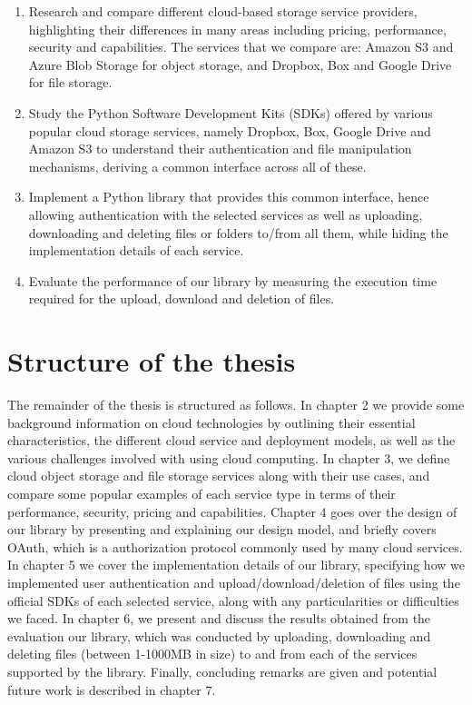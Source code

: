 \begin{enumerate}
	\item Research and compare different cloud-based storage service providers, highlighting their differences in many areas including pricing, performance, security and capabilities. The services that we compare are: Amazon S3 and Azure Blob Storage for object storage, and Dropbox, Box and Google Drive for file storage.

	\item Study the Python Software Development Kits (SDKs) offered by various popular cloud storage services, namely Dropbox, Box, Google Drive and Amazon S3 to understand their authentication and file manipulation mechanisms, deriving a common interface across all of these.

	\item Implement a Python library that provides this common interface, hence allowing authentication with the selected services as well as uploading, downloading and deleting files or folders to/from all them, while hiding the implementation details of each service.

	\item Evaluate the performance of our library by measuring the execution time required for the upload, download and deletion of files.
\end{enumerate}

\section{Structure of the thesis}
The remainder of the thesis is structured as follows. In chapter 2 we provide some background information on cloud technologies by outlining their essential characteristics, the different cloud service and deployment models, as well as the various challenges involved with using cloud computing. In chapter 3, we define cloud object storage and file storage services along with their use cases, and compare some popular examples of each service type in terms of their performance, security, pricing and capabilities. Chapter 4 goes over the design of our library by presenting and explaining our design model, and briefly covers OAuth, which is a authorization protocol commonly used by many cloud services. In chapter 5 we cover the implementation details of our library, specifying how we implemented user authentication and upload/download/deletion of files using the official SDKs of each selected service, along with any particularities or difficulties we faced. In chapter 6, we present and discuss the results obtained from the evaluation our library, which was conducted by uploading, downloading and deleting files (between 1-1000MB in size) to and from each of the services supported by the library. Finally, concluding remarks are given and potential future work is described in chapter 7.
